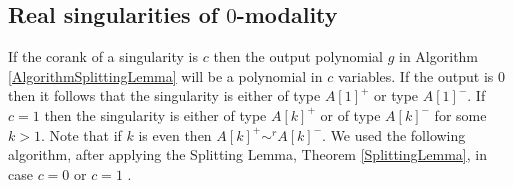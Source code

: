 \documentclass{amsproc}
\begin{document}
\subsection{Real singularities of $0$-modality}

If the corank of a singularity is $c$ then the output polynomial $g$ in Algorithm \ref{AlgorithmSplittingLemma} will be a polynomial in $c$ variables. If the output is $0$ then it follows  that the singularity is either of type $A[1]^+$ or type $A[1]^-$. If $c=1$ then the singularity is either of type $A[k]^+$ or of type $A[k]^-$ for some $k>1$. Note that if $k$ is even then $A[k]^+\sim^rA[k]^-$. We used the following algorithm, after applying the Splitting Lemma, Theorem \ref{SplittingLemma}, in case $c=0$ or $c=1$ .
\end{document}
